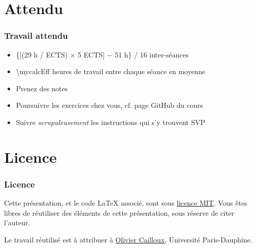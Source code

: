 \documentclass[english, french]{beamer}
\begin{document}
\section{Attendu}
\begin{frame}
	\frametitle{Travail attendu}
	\begin{itemize}
		\item \{[(29 h / ECTS) × 5 ECTS] − 51 h\} / 16 inter-séances
		\item \num[round-mode=places, round-precision=0, mode=text]{\mycalcEff} heures de travail entre chaque séance en moyenne
		\item Prenez des notes
		\item Poursuivre les exercices chez vous, cf. page GitHub du cours
		\item Suivre \emph{scrupuleusement} les instructions qui s’y trouvent SVP
	\end{itemize}
\end{frame}

\appendix
\section{Licence}
\begin{frame}
	\frametitle{Licence}
	Cette présentation, et le code LaTeX associé, sont sous \href{https://opensource.org/licenses/MIT}{licence MIT}. Vous êtes libres de réutiliser des éléments de cette présentation, sous réserve de citer l’auteur.
	
	Le travail réutilisé est à attribuer à \href{http://www.lamsade.dauphine.fr/~ocailloux/}{Olivier Cailloux}, Université Paris-Dauphine.
\end{frame}
\end{document}
